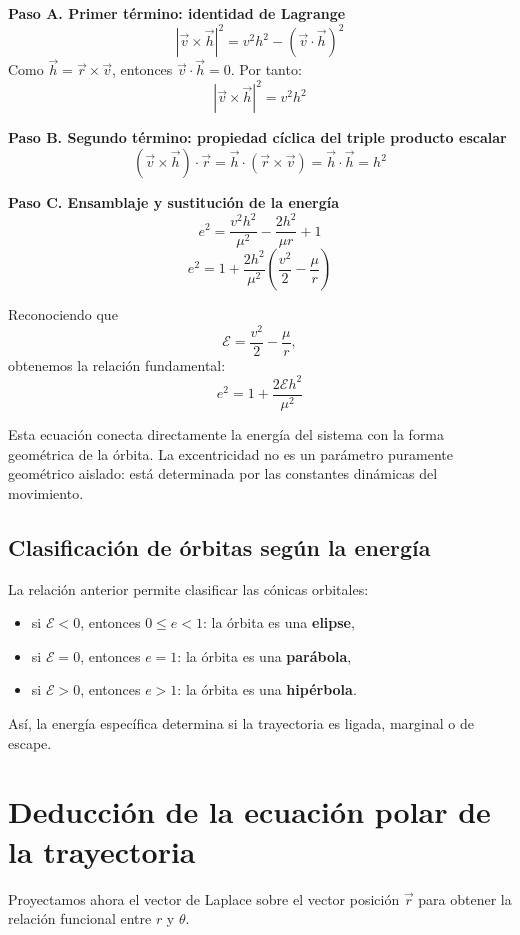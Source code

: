 \textbf{Paso A. Primer término: identidad de Lagrange}
\[
 |\vec{v} \times \vec{h}|^2 = v^2 h^2 - (\vec{v} \cdot \vec{h})^2
\]
Como \(\vec{h} = \vec{r} \times \vec{v}\), entonces \(\vec{v} \cdot \vec{h} = 0\). Por tanto:
\[
 |\vec{v} \times \vec{h}|^2 = v^2 h^2
\]

\textbf{Paso B. Segundo término: propiedad cíclica del triple producto escalar}
\[
 (\vec{v} \times \vec{h}) \cdot \vec{r} = \vec{h} \cdot (\vec{r} \times \vec{v}) = \vec{h} \cdot \vec{h} = h^2
\]

\textbf{Paso C. Ensamblaje y sustitución de la energía}
\[
 e^2 = \frac{v^2 h^2}{\mu^2} - \frac{2 h^2}{\mu r} + 1
\]
\[
 e^2 = 1 + \frac{2h^2}{\mu^2}\left(\frac{v^2}{2} - \frac{\mu}{r}\right)
\]

Reconociendo que
\[
\mathcal{E} = \frac{v^2}{2} - \frac{\mu}{r},
\]
obtenemos la relación fundamental:
\[
\boxed{e^2 = 1 + \frac{2\mathcal{E}h^2}{\mu^2}}
\]

\begin{importante}
Esta ecuación conecta directamente la energía del sistema con la forma geométrica de la órbita. La excentricidad no es un parámetro puramente geométrico aislado: está determinada por las constantes dinámicas del movimiento.
\end{importante}

\subsection{Clasificación de órbitas según la energía}
La relación anterior permite clasificar las cónicas orbitales:
\begin{itemize}
    \item si \(\mathcal{E} < 0\), entonces \(0 \le e < 1\): la órbita es una \textbf{elipse},
    \item si \(\mathcal{E} = 0\), entonces \(e = 1\): la órbita es una \textbf{parábola},
    \item si \(\mathcal{E} > 0\), entonces \(e > 1\): la órbita es una \textbf{hipérbola}.
\end{itemize}

Así, la energía específica determina si la trayectoria es ligada, marginal o de escape.

\section{Deducción de la ecuación polar de la trayectoria}
Proyectamos ahora el vector de Laplace sobre el vector posición \(\vec{r}\) para obtener la relación funcional entre \(r\) y \(\theta\).

